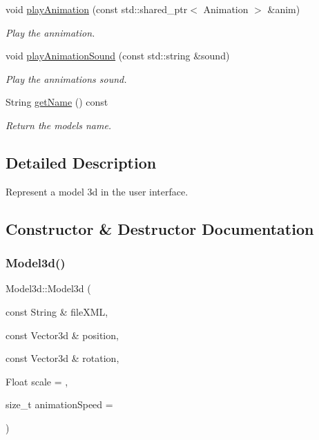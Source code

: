 \begin{DoxyCompactItemize}
void \hyperlink{classModel3d_a108ab9c13b7ae24cc1711c2e97fbc625}{play\+Animation} (const std\+::shared\+\_\+ptr$<$ Animation $>$ \&anim)
\begin{DoxyCompactList}\small\item\em Play the annimation. \end{DoxyCompactList}\item 
void \hyperlink{classModel3d_a6ce79286c43bd4a6852c544bdad8ee18}{play\+Animation\+Sound} (const std\+::string \&sound)
\begin{DoxyCompactList}\small\item\em Play the annimation\textquotesingle{}s sound. \end{DoxyCompactList}\item 
\mbox{\label{classModel3d_afa0ccf1c5b0c571afcfbef4a894e6b3a}} 
String \hyperlink{classModel3d_afa0ccf1c5b0c571afcfbef4a894e6b3a}{get\+Name} () const
\begin{DoxyCompactList}\small\item\em Return the model\textquotesingle{}s name. \end{DoxyCompactList}\end{DoxyCompactItemize}


\subsection{Detailed Description}
Represent a model 3d in the user interface. 

\subsection{Constructor \& Destructor Documentation}
\mbox{\label{classModel3d_a3382c1519f85b695a1d98b492207c339}} 
\subsubsection{\texorpdfstring{Model3d()}{Model3d()}}
{\footnotesize\ttfamily Model3d\+::\+Model3d (\begin{DoxyParamCaption}\item[{const String \&}]{file\+X\+ML,  }\item[{const Vector3d \&}]{position,  }\item[{const Vector3d \&}]{rotation,  }\item[{Float}]{scale = {},  }\item[{size\+\_\+t}]{animation\+Speed = {} }\end{DoxyParamCaption})}




